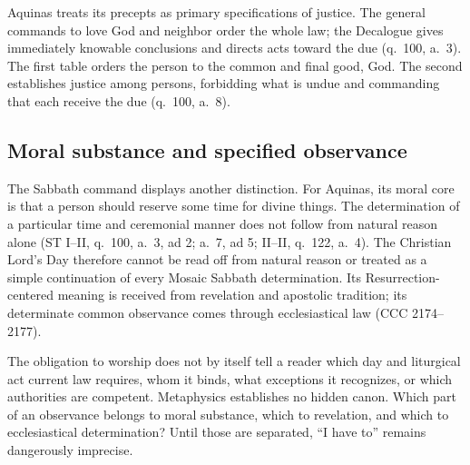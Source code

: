 Aquinas treats its precepts as primary specifications of justice. The general commands to love God and neighbor order the whole law; the Decalogue gives immediately knowable conclusions and directs acts toward the due (q.~100, a.~3). The first table orders the person to the common and final good, God. The second establishes justice among persons, forbidding what is undue and commanding that each receive the due (q.~100, a.~8).

\subsection{Moral substance and specified observance}

The Sabbath command displays another distinction. For Aquinas, its moral core is that a person should reserve some time for divine things. The determination of a particular time and ceremonial manner does not follow from natural reason alone (ST I--II, q.~100, a.~3, ad 2; a.~7, ad 5; II--II, q.~122, a.~4). The Christian Lord's Day therefore cannot be read off from natural reason or treated as a simple continuation of every Mosaic Sabbath determination. Its Resurrection-centered meaning is received from revelation and apostolic tradition; its determinate common observance comes through ecclesiastical law (CCC 2174--2177).

The obligation to worship does not by itself tell a reader which day and liturgical act current law requires, whom it binds, what exceptions it recognizes, or which authorities are competent. Metaphysics establishes no hidden canon. Which part of an observance belongs to moral substance, which to revelation, and which to ecclesiastical determination? Until those are separated, ``I have to'' remains dangerously imprecise.
